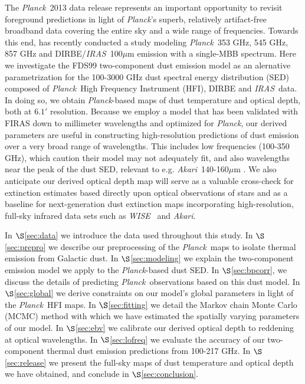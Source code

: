 \documentclass{emulateapj}
\newcommand{\IRAS}{{\it IRAS}}
\newcommand{\PLANCK}{{\it Planck}}
\newcommand{\AKARI}{{\it Akari}}
\newcommand{\WISE}{{\it WISE}}
\begin{document}
The \PLANCK~2013 data release \citep{planck2013} represents an important 
opportunity to revisit foreground predictions in light of \PLANCK's superb, 
relatively artifact-free broadband data covering the entire sky and a wide 
range of frequencies. Towards this end, \cite{planckdust} has recently 
conducted a study modeling \PLANCK~353 GHz, 545 GHz, 857 GHz and 
DIRBE/\IRAS~100$\mu$m emission with a single-MBB spectrum. Here we investigate 
the FDS99 two-component dust emission model as an alernative parametrization 
for the 100-3000 GHz dust spectral energy distribution (SED) composed  of 
\PLANCK~High Frequency Instrument (HFI), DIRBE and \IRAS~data. In doing so, we 
obtain \PLANCK-based maps of dust temperature and optical depth, both at $6.1'$
resolution. Because we employ a model that has been validated with FIRAS down 
to millimeter wavelengths and optimized for \PLANCK, our derived parameters are
useful in constructing high-resolution predictions of dust emission over a very
broad range of wavelengths. This includes low frequencies (100-350 GHz), which 
\cite{planckdust} caution their model may not adequately fit, and also 
wavelengths near the peak of the dust SED, relevant to e.g. 
\AKARI~140-160$\mu$m \citep{akari}. We also anticipate our derived optical 
depth map will serve as a valuable cross-check for extinction estimates based 
directly upon optical observations of stars \citep[e.g.][]{schlafly14} and as a
baseline for next-generation dust extinction maps incorporating 
high-resolution, full-sky infrared data sets such as 
\WISE~\citep{wright10, meisner14} and \AKARI.

In $\S$\ref{sec:data} we introduce the data used throughout this study. In 
$\S$\ref{sec:prepro} we describe our preprocessing of the \PLANCK~maps to 
isolate thermal emission from Galactic dust. In $\S$\ref{sec:modeling} we 
explain the two-component emission model we apply to the \PLANCK-based dust 
SED. In $\S$\ref{sec:bpcorr}, we discuss the details of predicting 
\PLANCK~observations based on this dust model. In $\S$\ref{sec:global} we 
derive constraints on our model's global parameters in light of the \PLANCK~HFI
maps. In $\S$\ref{sec:fitting} we detail the Markov chain Monte Carlo (MCMC) 
method with which we have estimated the spatially varying parameters of our 
model. In $\S$\ref{sec:ebv} we calibrate our derived optical depth to reddening
at optical wavelengths. In $\S$\ref{sec:lofreq} we evaluate the accuracy of our
two-component thermal dust emission predictions from 100-217 GHz. In 
$\S$\ref{sec:release} we present the full-sky maps of dust temperature and 
optical depth we have obtained, and conclude in $\S$\ref{sec:conclusion}.
\end{document}
